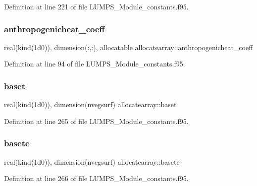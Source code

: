 Definition at line 221 of file L\+U\+M\+P\+S\+\_\+\+Module\+\_\+constants.\+f95.

\mbox{\label{namespaceallocatearray_a5288a5b9849ea3c057ec815db0858a9e}} 
\subsubsection{\texorpdfstring{anthropogenicheat\+\_\+coeff}{anthropogenicheat\_coeff}}
{\footnotesize\ttfamily real(kind(1d0)), dimension(\+:,\+:), allocatable allocatearray\+::anthropogenicheat\+\_\+coeff}



Definition at line 94 of file L\+U\+M\+P\+S\+\_\+\+Module\+\_\+constants.\+f95.

\mbox{\label{namespaceallocatearray_a49f3ef4737336da78b6aaacae1084644}} 
\subsubsection{\texorpdfstring{baset}{baset}}
{\footnotesize\ttfamily real(kind(1d0)), dimension(nvegsurf) allocatearray\+::baset}



Definition at line 265 of file L\+U\+M\+P\+S\+\_\+\+Module\+\_\+constants.\+f95.

\mbox{\label{namespaceallocatearray_a25e6bb019be7fb8c46aa2c0b067ff289}} 
\subsubsection{\texorpdfstring{basete}{basete}}
{\footnotesize\ttfamily real(kind(1d0)), dimension(nvegsurf) allocatearray\+::basete}



Definition at line 266 of file L\+U\+M\+P\+S\+\_\+\+Module\+\_\+constants.\+f95.

\mbox{\label{namespaceallocatearray_afbbcbdfd67c32839a537f74d1bc6ff5a}} 
